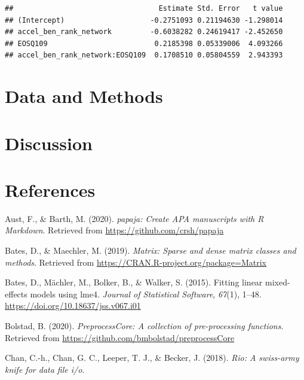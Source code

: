 \documentclass[
  english,
  man]{apa6}
\begin{document}
\begin{verbatim}
##                                  Estimate Std. Error   t value
## (Intercept)                    -0.2751093 0.21194630 -1.298014
## accel_ben_rank_network         -0.6038282 0.24619417 -2.452650
## EOSQ109                         0.2185398 0.05339006  4.093266
## accel_ben_rank_network:EOSQ109  0.1708510 0.05804559  2.943393
\end{verbatim}

\hypertarget{data-and-methods}{%
\section{Data and Methods}\label{data-and-methods}}

\hypertarget{discussion}{%
\section{Discussion}\label{discussion}}

\newpage

\hypertarget{references}{%
\section{References}\label{references}}

\begingroup
\setlength{\parindent}{-0.5in}
\setlength{\leftskip}{0.5in}

\hypertarget{refs}{}
\leavevmode\hypertarget{ref-R-papaja}{}%
Aust, F., \& Barth, M. (2020). \emph{papaja: Create APA manuscripts with R Markdown}. Retrieved from \url{https://github.com/crsh/papaja}

\leavevmode\hypertarget{ref-R-Matrix}{}%
Bates, D., \& Maechler, M. (2019). \emph{Matrix: Sparse and dense matrix classes and methods}. Retrieved from \url{https://CRAN.R-project.org/package=Matrix}

\leavevmode\hypertarget{ref-R-lme4}{}%
Bates, D., Mächler, M., Bolker, B., \& Walker, S. (2015). Fitting linear mixed-effects models using lme4. \emph{Journal of Statistical Software}, \emph{67}(1), 1--48. \url{https://doi.org/10.18637/jss.v067.i01}

\leavevmode\hypertarget{ref-R-preprocessCore}{}%
Bolstad, B. (2020). \emph{PreprocessCore: A collection of pre-processing functions}. Retrieved from \url{https://github.com/bmbolstad/preprocessCore}

\leavevmode\hypertarget{ref-R-rio}{}%
Chan, C.-h., Chan, G. C., Leeper, T. J., \& Becker, J. (2018). \emph{Rio: A swiss-army knife for data file i/o}.
\end{document}
